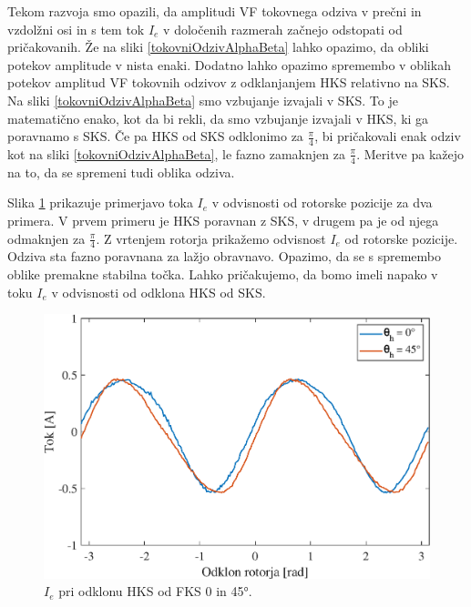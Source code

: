 \documentclass[a4paper,twoside,openright,12pt,slovene]{book}
\begin{document}
Tekom razvoja smo opazili, da amplitudi VF tokovnega odziva v prečni in vzdolžni osi in s tem tok $I_e$ v določenih razmerah začnejo odstopati od pričakovanih. Že na sliki \ref{tokovniOdzivAlphaBeta} 
lahko opazimo, da obliki potekov amplitude v nista enaki. Dodatno lahko opazimo spremembo v oblikah potekov amplitud VF tokovnih odzivov z odklanjanjem HKS relativno na SKS. Na sliki
\ref{tokovniOdzivAlphaBeta} smo vzbujanje izvajali v SKS. To je matematično enako, kot da bi rekli, da smo vzbujanje izvajali v HKS, ki ga poravnamo s SKS. Če pa HKS od SKS odklonimo za
$\frac{\pi}{4}$, bi pričakovali enak odziv kot na sliki \ref{tokovniOdzivAlphaBeta}, le fazno zamaknjen za $\frac{\pi}{4}$. Meritve pa kažejo na to, da se spremeni tudi oblika odziva.

Slika \ref{reguliranaVelicinaIdq0in45} prikazuje primerjavo toka $I_e$ v odvisnosti od rotorske pozicije za dva primera. V prvem primeru je HKS poravnan z SKS, v drugem pa je od njega odmaknjen za
$\frac{\pi}{4}$. Z vrtenjem rotorja prikažemo odvisnost $I_e$ od rotorske pozicije. Odziva sta fazno poravnana za lažjo obravnavo. Opazimo, da se s spremembo oblike premakne stabilna točka. Lahko
pričakujemo, da bomo imeli napako v toku $I_e$ v odvisnosti od odklona HKS od SKS.

\begin{figure}[!htbp]
    \centering
    \includegraphics[width=0.88\columnwidth]{Slike/reguliranaVelicinaIdq0in45.eps}
    \caption{\label{reguliranaVelicinaIdq0in45} $I_e$ pri odklonu HKS od FKS 0 in 45°.}
\end{figure}
\end{document}

